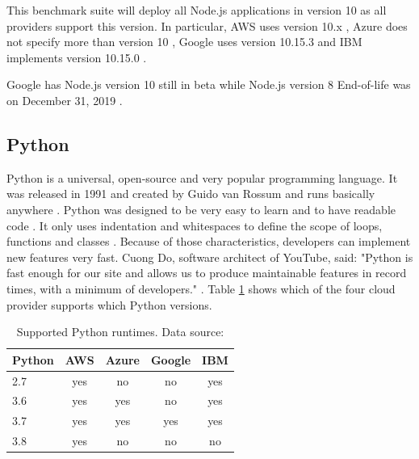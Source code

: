 This benchmark suite will deploy all Node.js applications in version 10 as all providers support this version. In particular, \gls{AWS} uses version 10.x \cite{AWSLambdaLanguages}, Azure does not specify more than version 10 \cite{AzureFunctionsLanguages}, Google uses version 10.15.3 \cite{GoogleFunctionsRuntimes} and \gls{IBM} implements version 10.15.0 \cite{IBMRuntimes}.

\begin{remark}
Google has Node.js version 10 still in beta while Node.js version 8 End-of-life was on December 31, 2019 \cite{NodejsReleases}.
\end{remark}

\subsection{Python}

Python is a universal, open-source and very popular programming language. It was released in 1991 and created by Guido van Rossum \cite{PythonIntro} and runs basically anywhere \cite{PythonAbout}. Python was designed to be very easy to learn and to have readable code \cite{PythonIntro}. It only uses indentation and whitespaces to define the scope of loops, functions and classes \cite{PythonIntro}. Because of those characteristics, developers can implement new features very fast. Cuong Do, software architect of YouTube, said: "Python is fast enough for our site and allows us to produce maintainable features in record times, with a minimum of developers." \cite{PythonQuotes}. Table \ref{table:python} shows which of the four cloud provider supports which Python versions.

\begin{table}[htp]
\centering
\captionsetup[table]{justification=centering, labelfont=bf}
\begin{tabular}{|l|c|c|c|c|} 
 \hline
 Python & AWS & Azure & Google & IBM \\ \hline
2.7  & \cellcolor{green!25}yes    & \cellcolor{red!25}no    & \cellcolor{red!25}no  & \cellcolor{green!25}yes\\ \hline
3.6  & \cellcolor{green!25}yes & \cellcolor{green!25}yes & \cellcolor{red!25}no   & \cellcolor{green!25}yes \\ \hline
3.7 & \cellcolor{green!25}yes & \cellcolor{green!25}yes & \cellcolor{green!25}yes  & \cellcolor{green!25}yes \\ \hline
3.8 & \cellcolor{green!25}yes & \cellcolor{red!25}no & \cellcolor{red!25}no  & \cellcolor{red!25}no  \\ \hline
\end{tabular}
\caption[Supported Python runtimes]{Supported Python runtimes. Data source: \cite{AWSLambdaLanguages, AzureFunctionsLanguages, GoogleFunctionsLanguages, IBMRuntimes}}
\label{table:python}
\end{table}

